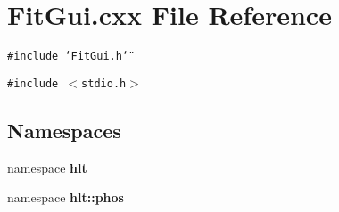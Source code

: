 \section{Fit\-Gui.cxx File Reference}
\label{FitGui_8cxx}
{\tt \#include \char`\"{}Fit\-Gui.h\char`\"{}}\par
{\tt \#include $<$stdio.h$>$}\par
\subsection*{Namespaces}
\begin{CompactItemize}
\item 
namespace {\bf hlt}
\item 
namespace {\bf hlt::phos}
\end{CompactItemize}
